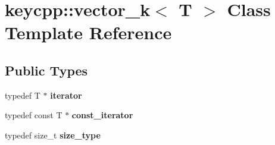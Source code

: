 \hypertarget{classkeycpp_1_1vector__k}{\section{keycpp\-:\-:vector\-\_\-k$<$ T $>$ Class Template Reference}
\label{classkeycpp_1_1vector__k}
}
\subsection*{Public Types}
\begin{DoxyCompactItemize}
\item 
\hypertarget{classkeycpp_1_1vector__k_af4ac972a753299ebb2c099ed11de6382}{typedef T $\ast$ {\bfseries iterator}}\label{classkeycpp_1_1vector__k_af4ac972a753299ebb2c099ed11de6382}

\item 
\hypertarget{classkeycpp_1_1vector__k_a30a91c02d08abdf62f193f35814858c5}{typedef const T $\ast$ {\bfseries const\-\_\-iterator}}\label{classkeycpp_1_1vector__k_a30a91c02d08abdf62f193f35814858c5}

\item 
\hypertarget{classkeycpp_1_1vector__k_a66a8ed8296d754341cedd8b242fc980a}{typedef size\-\_\-t {\bfseries size\-\_\-type}}\label{classkeycpp_1_1vector__k_a66a8ed8296d754341cedd8b242fc980a}

\end{DoxyCompactItemize}
